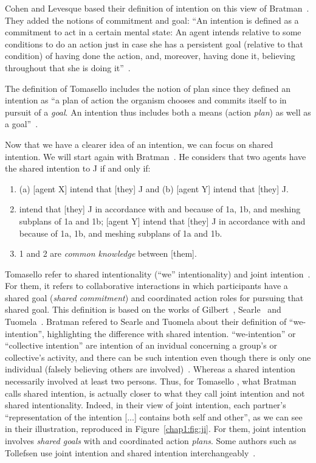 \documentclass[a4paper,11pt,twoside]{StyleThese}
\begin{document}
Cohen and Levesque based their definition of intention on this view of Bratman~\cite{cohen_1990_intention}. They added the notions of commitment and goal: ``An intention is defined as a commitment to act in a certain mental state: An agent intends relative to some conditions to do an action just in case she has a persistent goal (relative to that condition) of having done the action, and, moreover, having done it, believing throughout that she is doing it''~\cite[p.~496]{cohen_1991_teamwork}. 

The definition of Tomasello \etal{} includes the notion of plan since they defined an intention as ``a plan of action the organism chooses and commits itself to in pursuit of a \emph{goal}. An intention thus includes both a means (action \emph{plan}) as well as a goal''~\cite[p.~676]{tomasello_2005_understanding}. 

Now that we have a clearer idea of an intention, we can focus on shared intention. We will start again with Bratman~\cite{bratman_1993_shared}. He considers that two agents have the shared intention to J if and only if: 
\begin{enumerate}
	\item (a) [agent X] intend that [they] J and (b) [agent Y] intend that [they] J.
	\item\relax [agent X] intend that [they] J in accordance with and because of 1a, 1b, and meshing subplans of 1a and 1b; [agent Y] intend that [they] J in accordance with and because of 1a, 1b, and meshing subplans of 1a and 1b.
	\item 1 and 2 are \emph{common knowledge} between [them].
\end{enumerate}

Tomasello \etal{} refer to shared intentionality (``we'' intentionality) and joint intention~\cite{tomasello_2005_understanding}. For them, it refers to collaborative interactions in which participants have a shared goal (\emph{shared commitment}) and coordinated action roles for pursuing that shared goal. This definition is based on the works of Gilbert~\cite{gilbert_1989_social}, Searle~\cite{searle_1983_intentionality} and Tuomela~\cite{tuomela_1995_importance}. Bratman refered to Searle and Tuomela about their definition of ``we-intention'', highlighting the difference with shared intention. ``we-intention'' or ``collective intention'' are intention of an invidual concerning a group's or collective's activity, and there can be such intention even though there is only one individual (falsely believing others are involved)~\cite{bratman_1993_shared}. Whereas a shared intention necessarily involved at least two persons. Thus, for Tomasello \etal, what Bratman calls shared intention, is actually closer to what they call joint intention and not shared intentionality. Indeed, in their view of joint intention, each partner's ``representation of the intention [...] contains both self and other'', as we can see in their illustration, reproduced in Figure~\ref{chap1:fig:ji}. For them, joint intention involves \emph{shared goals} with and coordinated action \emph{plans}. Some authors such as Tollefsen use joint intention and shared intention interchangeably~\cite{tollefsen_2005_let}.
\end{document}
